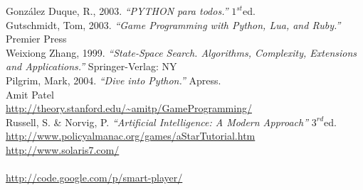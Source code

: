 \documentclass[a4paper,12pt,oneside]{book}
\renewcommand{\baselinestretch}{1.5}
\begin{document}
\newpage
\renewcommand{\baselinestretch}{1}
\normalsize
\begin{thebibliography}{XXX}
 González Duque, R., 2003. {\it ``PYTHON para todos.''} $1^{st}$ed. \\
 Gutschmidt, Tom, 2003. {\it ``Game Programming with Python,
    Lua, and Ruby.''  } Premier Press \\
 Weixiong Zhang, 1999. {\it ``State-Space Search. Algorithms,
    Complexity, Extensions and Applications.''} Springer-Verlag: NY \\
 Pilgrim, Mark, 2004. {\it ``Dive into Python.''} Apress. \\
 Amit Patel\\ \url{
    http://theory.stanford.edu/~amitp/GameProgramming/} \label{amit}
  \\
 Russell, S. \& Norvig, P. {\it ``Artificial Intelligence: A
    Modern Approach''} $3^{rd}$ed. \\ \label{russell}
  \url{http://www.policyalmanac.org/games/aStarTutorial.htm}\\
  \url{http://www.solaris7.com/ }\\
  \url{ }\\
  \url{http://code.google.com/p/smart-player/ } \label{googlecode}
\end{thebibliography}
\end{document}
